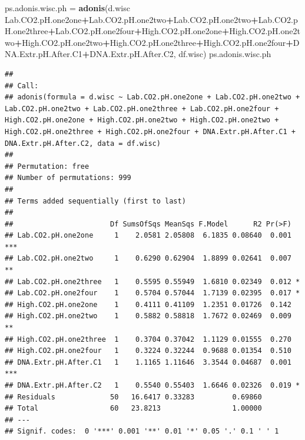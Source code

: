 \documentclass[]{article}
\newenvironment{Shaded}{\begin{snugshade}}{\end{snugshade}}
\newcommand{\KeywordTok}[1]{\textcolor[rgb]{0.13,0.29,0.53}{\textbf{#1}}}
\newcommand{\NormalTok}[1]{#1}
\newcommand{\OperatorTok}[1]{\textcolor[rgb]{0.81,0.36,0.00}{\textbf{#1}}}
\newcommand{\StringTok}[1]{\textcolor[rgb]{0.31,0.60,0.02}{#1}}
\begin{document}
\begin{Shaded}
\begin{Highlighting}[]
\NormalTok{ps.adonis.wisc.ph =}\StringTok{ }\KeywordTok{adonis}\NormalTok{(d.wisc }\OperatorTok{~}\StringTok{ }\NormalTok{Lab.CO2.pH.one2one}\OperatorTok{+}\NormalTok{Lab.CO2.pH.one2two}\OperatorTok{+}\NormalTok{Lab.CO2.pH.one2two}\OperatorTok{+}\NormalTok{Lab.CO2.pH.one2three}\OperatorTok{+}\NormalTok{Lab.CO2.pH.one2four}\OperatorTok{+}\NormalTok{High.CO2.pH.one2one}\OperatorTok{+}\NormalTok{High.CO2.pH.one2two}\OperatorTok{+}\NormalTok{High.CO2.pH.one2two}\OperatorTok{+}\NormalTok{High.CO2.pH.one2three}\OperatorTok{+}\NormalTok{High.CO2.pH.one2four}\OperatorTok{+}\NormalTok{DNA.Extr.pH.After.C1}\OperatorTok{+}\NormalTok{DNA.Extr.pH.After.C2, df.wisc)}
\NormalTok{ps.adonis.wisc.ph}
\end{Highlighting}
\end{Shaded}

\begin{verbatim}
## 
## Call:
## adonis(formula = d.wisc ~ Lab.CO2.pH.one2one + Lab.CO2.pH.one2two +      Lab.CO2.pH.one2two + Lab.CO2.pH.one2three + Lab.CO2.pH.one2four +      High.CO2.pH.one2one + High.CO2.pH.one2two + High.CO2.pH.one2two +      High.CO2.pH.one2three + High.CO2.pH.one2four + DNA.Extr.pH.After.C1 +      DNA.Extr.pH.After.C2, data = df.wisc) 
## 
## Permutation: free
## Number of permutations: 999
## 
## Terms added sequentially (first to last)
## 
##                       Df SumsOfSqs MeanSqs F.Model      R2 Pr(>F)    
## Lab.CO2.pH.one2one     1    2.0581 2.05808  6.1835 0.08640  0.001 ***
## Lab.CO2.pH.one2two     1    0.6290 0.62904  1.8899 0.02641  0.007 ** 
## Lab.CO2.pH.one2three   1    0.5595 0.55949  1.6810 0.02349  0.012 *  
## Lab.CO2.pH.one2four    1    0.5704 0.57044  1.7139 0.02395  0.017 *  
## High.CO2.pH.one2one    1    0.4111 0.41109  1.2351 0.01726  0.142    
## High.CO2.pH.one2two    1    0.5882 0.58818  1.7672 0.02469  0.009 ** 
## High.CO2.pH.one2three  1    0.3704 0.37042  1.1129 0.01555  0.270    
## High.CO2.pH.one2four   1    0.3224 0.32244  0.9688 0.01354  0.510    
## DNA.Extr.pH.After.C1   1    1.1165 1.11646  3.3544 0.04687  0.001 ***
## DNA.Extr.pH.After.C2   1    0.5540 0.55403  1.6646 0.02326  0.019 *  
## Residuals             50   16.6417 0.33283         0.69860           
## Total                 60   23.8213                 1.00000           
## ---
## Signif. codes:  0 '***' 0.001 '**' 0.01 '*' 0.05 '.' 0.1 ' ' 1
\end{verbatim}
\end{document}
